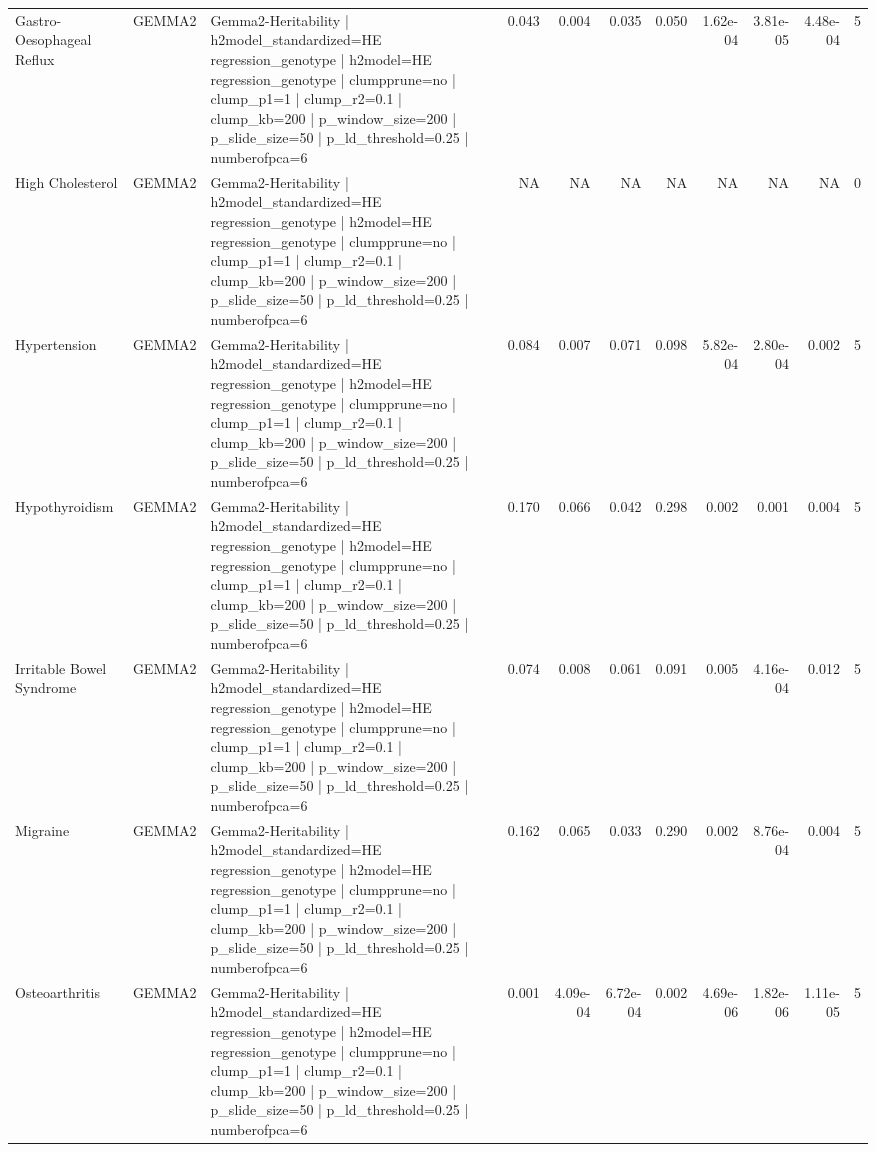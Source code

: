 \begin{landscape}
\begin{longtable}{p{2.4cm}p{1.8cm}p{6.0cm}rrrrrrrr}
Gastro-Oesophageal Reflux & GEMMA2 & Gemma2-Heritability | h2model\_standardized=HE regression\_genotype | h2model=HE regression\_genotype | clumpprune=no | clump\_p1=1 | clump\_r2=0.1 | clump\_kb=200 | p\_window\_size=200 | p\_slide\_size=50 | p\_ld\_threshold=0.25 | numberofpca=6 & 0.043 & 0.004 & 0.035 & 0.050 & 1.62e-04 & 3.81e-05 & 4.48e-04 & 5 \\
High Cholesterol & GEMMA2 & Gemma2-Heritability | h2model\_standardized=HE regression\_genotype | h2model=HE regression\_genotype | clumpprune=no | clump\_p1=1 | clump\_r2=0.1 | clump\_kb=200 | p\_window\_size=200 | p\_slide\_size=50 | p\_ld\_threshold=0.25 | numberofpca=6 & NA & NA & NA & NA & NA & NA & NA & 0 \\
Hypertension & GEMMA2 & Gemma2-Heritability | h2model\_standardized=HE regression\_genotype | h2model=HE regression\_genotype | clumpprune=no | clump\_p1=1 | clump\_r2=0.1 | clump\_kb=200 | p\_window\_size=200 | p\_slide\_size=50 | p\_ld\_threshold=0.25 | numberofpca=6 & 0.084 & 0.007 & 0.071 & 0.098 & 5.82e-04 & 2.80e-04 & 0.002 & 5 \\
Hypothyroidism & GEMMA2 & Gemma2-Heritability | h2model\_standardized=HE regression\_genotype | h2model=HE regression\_genotype | clumpprune=no | clump\_p1=1 | clump\_r2=0.1 | clump\_kb=200 | p\_window\_size=200 | p\_slide\_size=50 | p\_ld\_threshold=0.25 | numberofpca=6 & 0.170 & 0.066 & 0.042 & 0.298 & 0.002 & 0.001 & 0.004 & 5 \\
Irritable Bowel Syndrome & GEMMA2 & Gemma2-Heritability | h2model\_standardized=HE regression\_genotype | h2model=HE regression\_genotype | clumpprune=no | clump\_p1=1 | clump\_r2=0.1 | clump\_kb=200 | p\_window\_size=200 | p\_slide\_size=50 | p\_ld\_threshold=0.25 | numberofpca=6 & 0.074 & 0.008 & 0.061 & 0.091 & 0.005 & 4.16e-04 & 0.012 & 5 \\
Migraine & GEMMA2 & Gemma2-Heritability | h2model\_standardized=HE regression\_genotype | h2model=HE regression\_genotype | clumpprune=no | clump\_p1=1 | clump\_r2=0.1 | clump\_kb=200 | p\_window\_size=200 | p\_slide\_size=50 | p\_ld\_threshold=0.25 | numberofpca=6 & 0.162 & 0.065 & 0.033 & 0.290 & 0.002 & 8.76e-04 & 0.004 & 5 \\
Osteoarthritis & GEMMA2 & Gemma2-Heritability | h2model\_standardized=HE regression\_genotype | h2model=HE regression\_genotype | clumpprune=no | clump\_p1=1 | clump\_r2=0.1 | clump\_kb=200 | p\_window\_size=200 | p\_slide\_size=50 | p\_ld\_threshold=0.25 | numberofpca=6 & 0.001 & 4.09e-04 & 6.72e-04 & 0.002 & 4.69e-06 & 1.82e-06 & 1.11e-05 & 5 \\

\end{longtable}
\end{landscape}
